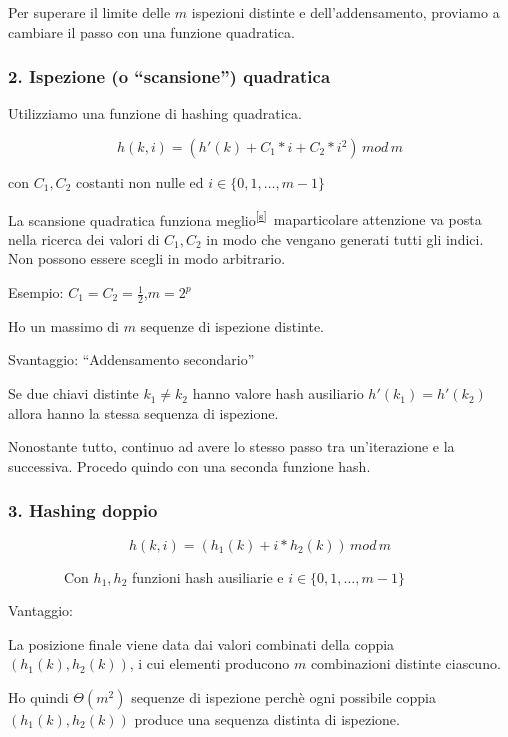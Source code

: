 \documentclass[11pt,a4paper,twoside,openright]{book}
\begin{document}
{Per superare il limite delle $m$ ispezioni distinte e dell'addensamento, proviamo a cambiare il passo con una funzione quadratica.}

\subsubsection{2. Ispezione (o ``scansione'') quadratica}

{Utilizziamo una funzione di hashing quadratica.}

\begin{equation}
h(k,i) = (h'(k) + C_1*i + C_2 * i^2)\,mod\,m
\end{equation}

{con $C_1,C_2$ costanti non nulle ed $i \in \{0,1,\ldots,m-1\}$}

{La scansione quadratica funziona meglio}\textsuperscript{\protect\hyperlink{cmnt19}{{[}s{]}}}{~maparticolare attenzione va posta nella ricerca dei valori di $C_1,C_2$ in modo che vengano generati tutti gli indici. Non possono essere scegli in modo arbitrario.}

{Esempio: $C_1=C_2=\frac{1}{2}$,$m=2^p$}

{Ho un massimo di $m$ sequenze di ispezione distinte.}

{Svantaggio}{: ``Addensamento secondario''}

{Se due chiavi distinte $k_1 \neq k_2$ hanno valore hash ausiliario $h'(k_1) = h'(k_2)$ allora hanno la stessa sequenza di ispezione.}

{Nonostante tutto, continuo ad avere lo stesso passo tra un'iterazione e la successiva. Procedo quindo con una seconda funzione hash.}

\subsubsection{3. Hashing doppio}

\begin{equation}
h(k,i) = (h_1(k) + i*h_2(k))\,mod\,m
\end{equation}		

{~~~~~~~~Con $h_1,h_2$ funzioni hash ausiliarie e $i \in \{0,1,\ldots,m-1\}$}

{Vantaggio:}

{La posizione finale viene data dai valori combinati della coppia $(h_1(k),h_2(k))$, i cui elementi producono $m$ combinazioni distinte ciascuno.}

{Ho quindi $\Theta(m^2)$ sequenze di ispezione perchè ogni possibile coppia $(h_1(k),h_2(k))$ produce una sequenza distinta di ispezione.}
\end{document}
